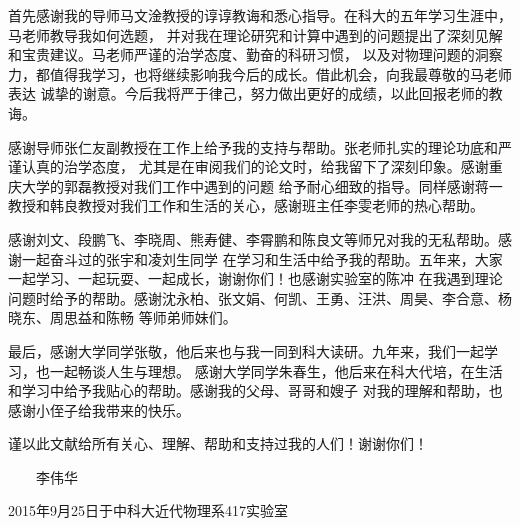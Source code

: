 ﻿
\begin{thanks}
首先感谢我的导师马文淦教授的谆谆教诲和悉心指导。在科大的五年学习生涯中，马老师教导我如何选题，
并对我在理论研究和计算中遇到的问题提出了深刻见解和宝贵建议。马老师严谨的治学态度、勤奋的科研习惯，
以及对物理问题的洞察力，都值得我学习，也将继续影响我今后的成长。借此机会，向我最尊敬的马老师表达
诚挚的谢意。今后我将严于律己，努力做出更好的成绩，以此回报老师的教诲。

感谢导师张仁友副教授在工作上给予我的支持与帮助。张老师扎实的理论功底和严谨认真的治学态度，
尤其是在审阅我们的论文时，给我留下了深刻印象。感谢重庆大学的郭磊教授对我们工作中遇到的问题
给予耐心细致的指导。同样感谢蒋一教授和韩良教授对我们工作和生活的关心，感谢班主任李雯老师的热心帮助。

感谢刘文、段鹏飞、李晓周、熊寿健、李霄鹏和陈良文等师兄对我的无私帮助。感谢一起奋斗过的张宇和凌刘生同学
在学习和生活中给予我的帮助。五年来，大家一起学习、一起玩耍、一起成长，谢谢你们！也感谢实验室的陈冲
在我遇到理论问题时给予的帮助。感谢沈永柏、张文娟、何凯、王勇、汪洪、周昊、李合意、杨晓东、周思益和陈畅
等师弟师妹们。

最后，感谢大学同学张敬，他后来也与我一同到科大读研。九年来，我们一起学习，也一起畅谈人生与理想。
感谢大学同学朱春生，他后来在科大代培，在生活和学习中给予我贴心的帮助。感谢我的父母、哥哥和嫂子
对我的理解和帮助，也感谢小侄子给我带来的快乐。

谨以此文献给所有关心、理解、帮助和支持过我的人们！谢谢你们！
\vskip 18pt

\begin{flushright}

~~~~李伟华~~~~

2015年9月25日于中科大近代物理系417实验室

\end{flushright}

\end{thanks}
